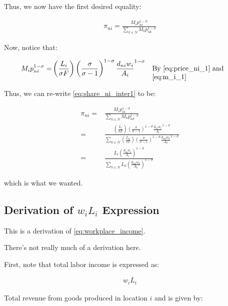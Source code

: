 \documentclass[10pt]{article}
\begin{document}
Thus, we now have the first desired equality:

\begin{align}
    \pi_{n i}=\frac{M_i p_{n i}^{1-\sigma}}{\sum_{k \in N} M_k p_{n k}^{1-\sigma}} \label{eq:share_ni_inter1}
\end{align}

Now, notice that:

\begin{align}
    M_i p_{ni}^{1-\sigma} = &\left(\frac{L_i}{\sigma F}\right) \left(\frac{\sigma}{\sigma-1}\right)^{1-\sigma} \frac{d_{ni} w_i}{A_i}^{1-\sigma} && \parbox[t]{4cm}{\raggedright By \eqref{eq:price_ni_1} and \eqref{eq:m_i_1}}
\end{align}

Thus, we can re-write \eqref{eq:share_ni_inter1} to be: 

\begin{align}
    \pi_{n i}=&\frac{M_i p_{n i}^{1-\sigma}}{\sum_{k \in N} M_k p_{n k}^{1-\sigma}} \\
    = &\frac{\left(\frac{L_i}{\sigma F}\right) \left(\frac{\sigma}{\sigma-1}\right)^{1-\sigma} \frac{d_{ni} w_i}{A_i}^{1-\sigma}}{\sum_{k \in N} \left(\frac{L_k}{\sigma F}\right) \left(\frac{\sigma}{\sigma-1}\right)^{1-\sigma} \frac{d_{nk} w_k}{A_k}^{1-\sigma}} \\
    = &\frac{L_i \left(\frac{d_{ni} w_i}{A_i}\right)^{1-\sigma}}{\sum_{k \in N} L_k \left(\frac{d_{nk} w_k}{A_k}\right)^{1-\sigma}}
\end{align}

which is what we wanted.


\subsection{Derivation of $w_i L_i$ Expression}
\label{sec:workplace_income}

This is a derivation of \eqref{eq:workplace_income}.

There's not really much of a derivation here. 

First, note that total labor income is expressed as:

\begin{align}
    w_i L_i
\end{align}

Total revenue from goods produced in location $i$ and is given by:
\end{document}
